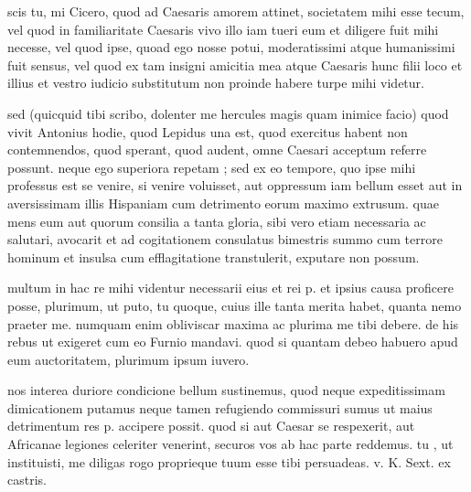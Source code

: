  scis tu, mi Cicero, quod ad Caesaris amorem attinet, societatem mihi esse tecum, vel quod in familiaritate Caesaris vivo illo iam tueri eum et diligere fuit mihi necesse, vel quod ipse, quoad ego nosse potui, moderatissimi atque humanissimi fuit sensus, vel quod ex tam insigni amicitia mea atque Caesaris hunc filii loco et illius et vestro iudicio substitutum non proinde habere turpe mihi videtur.

 sed (quicquid tibi scribo, dolenter me hercules magis quam inimice facio) quod vivit Antonius hodie, quod Lepidus una est, quod exercitus habent non contemnendos, quod sperant, quod audent, omne Caesari acceptum referre possunt. neque ego superiora repetam ; sed ex eo tempore, quo ipse mihi professus est se venire, si venire voluisset, aut oppressum iam bellum esset aut in aversissimam illis Hispaniam cum detrimento eorum maximo extrusum. quae mens eum aut quorum consilia a tanta gloria, sibi vero etiam necessaria ac salutari, avocarit et ad cogitationem consulatus bimestris summo cum terrore hominum et insulsa cum efflagitatione transtulerit, exputare non possum.

 multum in hac re mihi videntur necessarii eius et rei p. et ipsius causa proficere posse, plurimum, ut puto, tu quoque, cuius ille tanta merita habet, quanta nemo praeter me. numquam enim obliviscar maxima ac plurima me tibi debere. de his rebus ut exigeret cum eo Furnio mandavi. quod si quantam debeo habuero apud eum auctoritatem, plurimum ipsum iuvero.

 nos interea duriore condicione bellum sustinemus, quod neque expeditissimam dimicationem putamus neque tamen refugiendo commissuri sumus ut maius detrimentum res p. accipere possit. quod si aut Caesar se respexerit, aut Africanae legiones celeriter venerint, securos vos ab hac parte reddemus. tu , ut instituisti, me diligas rogo proprieque tuum esse tibi persuadeas. v. K. Sext. ex castris.
